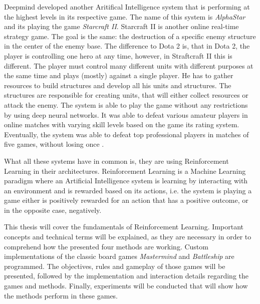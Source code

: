 Deepmind developed another Aritifical Intelligence system that is performing at the highest levels in its respective game. The name of this system is \textit{AlphaStar} and its playing the game \textit{Starcraft II}. Starcraft II is another online real-time strategy game. The goal is the same: the destruction of a specific enemy structure in the center of the enemy base. The difference to Dota 2 is, that in Dota 2, the player is controlling one hero at any time, however, in Straftcraft II this is different. The player must control many different units with different purposes at the same time and plays (mostly) against a single player. He has to gather resources to build structures and develop all his units and structures. The structures are responsible for creating units, that will either collect resources or attack the enemy. The system is able to play the game without any restrictions by using deep neural networks. It was able to defeat various amateur players in online matches with varying skill levels based on the game its rating system. Eventually, the system was able to defeat top professional players in matches of five games, without losing once \cite{vinyals2019grandmaster}.

What all these systems have in common is, they are using Reinforcement Learning in their architectures. Reinforcement Learning is a Machine Learning paradigm where an Artificial Intelligence system is learning by interacting with an environment and is rewarded based on its actions, i.e. the system is playing a game either is positively rewarded for an action that has a positive outcome, or in the opposite case, negatively.

This thesis will cover the fundamentals of Reinforcement Learning. Important concepts and technical terms will be explained, as they are necessary in order to comprehend how the presented four methods are working. Custom implementations of the classic board games \textit{Mastermind} and \textit{Battleship} are programmed. The objectives, rules and gameplay of those games will be presented, followed by the implementation and interaction details regarding the games and methods. Finally, experiments will be conducted that will show how the methods perform in these games.



